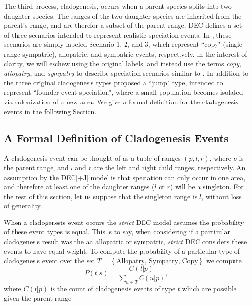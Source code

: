 \documentclass{article}
\begin{document}
The third process, cladogenesis, occurs when a parent species splits into two
daughter species.
The ranges of the two daughter species are inherited from the parent's range,
and are therefor a subset of the parent range.
DEC defines a set of three scenarios intended to represent realistic speciation
events.
In \citet{ALikelihoodFrReeR2005}, these scenarios are simply labeled Scenario 1,
2, and 3, which represent ``copy" (single-range sympatric), allopatric, and
sympatric events, respectively.
In the interest of clarity, we will eschew using the original labels, and
instead use the terms \textit{copy}, \textit{allopatry}, and \textit{sympatry}
to describe speciation scenarios similar to \citet{ModelSelectionMatzke2014}.
In addition to the three original cladogenesis types 
\citet{ModelSelectionMatzke2014} proposed a ``jump" type, intended to represent
``founder-event speciation", where a small population becomes isolated via
colonization of a new area.
We give a formal definition for the cladogenesis events in the following Section.

\subsection{A Formal Definition of Cladogenesis Events}
\label{sec:formal-cladogenesis}

A cladogenesis event can be thought of as a tuple of ranges $(p, l, r)$, where
$p$ is the parent range, and $l$ and $r$ are the left and right child ranges,
respectively. 
An assumption by the DEC[+J] model is that speciation can only occur in one
area, and therefore at least one of the daughter ranges ($l$ or $r$) will be a
singleton.
For the rest of this section, let us suppose that the singleton range is $l$,
without loss of generality.

When a cladogenesis event occurs the \textit{strict} DEC model assumes the
probability of these event types is equal.
This is to say, when considering if a particular cladogenesis result was the
an allopatric or sympatric, \textit{strict} DEC considers these events to
have equal weight.
To compute the probability of a particular type of cladogenesis event over the
set \(T = \left\{\text{Allopatry, Sympatry, Copy}\right\}\) we compute
\[
	P(t |
	s) = \frac{C(t | p)}{\sum_{u \in T} C(u | p)},
\]
where \( C(t|p) \) is the
count of cladogenesis events of type $ t $ which are possible given the parent
range.
\end{document}
